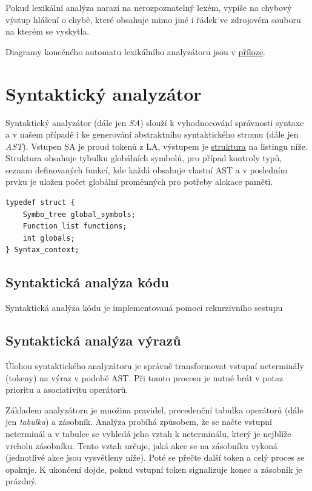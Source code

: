 \documentclass[a4paper,11pt]{article}
\begin{document}
Pokud lexikální analýza narazí na nerozpoznatelný lexém, vypíše na chybový výstup hlášení o chybě, které obsahuje mimo jiné i řádek ve zdrojovém souboru na kterém se vyskytla.

Diagramy konečného automatu lexikálního analyzátoru jsou v \hyperref[diag:LA-FSM]{příloze}.


\section{Syntaktický analyzátor}
Syntaktický analyzátor (dále jen \textit{SA}) slouží k vyhodnocování správnosti syntaxe a v našem případě i ke generování abstraktního syntaktického stromu (dále jen \textit{AST}). Vstupen SA je proud tokenů z LA, výstupem je \hyperref[lst:saOut]{struktura} na listingu níže. Struktura obsahuje tybulku globálních symbolů, pro případ kontroly typů, seznam definovaných funkcí, kde každá obsahuje vlastní AST a v posledním prvku je uložen počet globální proměnných pro potřeby alokace paměti.

\begin{lstlisting}[caption={Výstupní struktura SA}, label={lst:saOut}]
typedef struct {
	Symbo_tree global_symbols;
	Function_list functions;
	int globals;
} Syntax_context;
\end{lstlisting}

\subsection{Syntaktická analýza kódu}
Syntaktická analýza kódu je implementovaná pomocí rekurzivního sestupu

\subsection{Syntaktická analýza výrazů}
Úlohou syntaktického analyzátoru je správně transformovat vstupní neterminály (tokeny) na výraz v podobě AST. Při tomto procesu je nutné brát v potaz prioritu a asociativitu operátorů.

Základem analyzátoru je množina pravidel, precedenční tabulka operátorů (dále jen \textit{tabulka}) a zásobník.
Analýza probíhá způsobem, že se načte vstupní neterminál a v tabulce se vyhledá jeho vztah k neterminálu, který je nejblíže vrcholu zásobníku. Tento vztah určuje, jaká akce se na zásobníku vykoná (jednotlivé akce jsou vysvětleny níže). Poté se přečte další token a celý proces se opakuje. K ukončení dojde, pokud vstupní token signalizuje konec a zásobník je prázdný.
\end{document}
